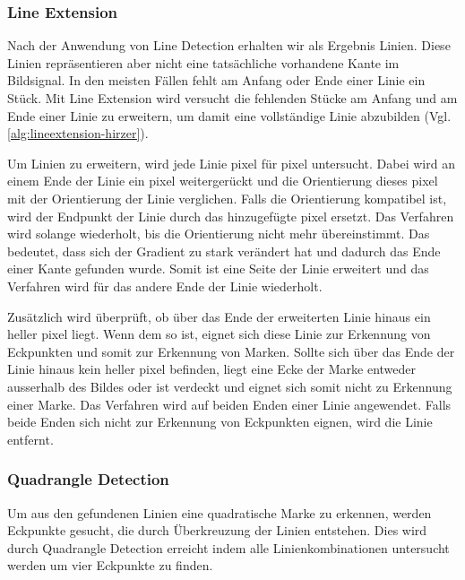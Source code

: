 \subsubsection{Line Extension} %
\label{sub:line_extension}



Nach der Anwendung von Line Detection erhalten wir als Ergebnis Linien. Diese Linien repräsentieren aber nicht eine
 tatsächliche vorhandene Kante im Bildsignal. In den meisten Fällen fehlt am Anfang oder Ende einer Linie ein Stück.
 Mit Line Extension wird versucht die fehlenden Stücke am Anfang und am Ende einer Linie zu erweitern, um damit eine
 vollständige Linie abzubilden (Vgl. \autoref{alg:lineextension-hirzer}).

Um Linien zu erweitern, wird jede Linie \gls{pixel} für \gls{pixel} untersucht. Dabei wird an einem Ende der Linie
 ein \gls{pixel} weitergerückt und die Orientierung dieses \gls{pixel} mit der Orientierung der Linie verglichen. Falls
 die Orientierung kompatibel ist, wird der Endpunkt der Linie durch das hinzugefügte \gls{pixel} ersetzt. Das Verfahren
 wird solange wiederholt, bis die Orientierung nicht mehr übereinstimmt. Das bedeutet, dass sich der Gradient zu stark
 verändert hat und dadurch das Ende einer Kante gefunden wurde. Somit ist eine Seite der Linie erweitert und das
 Verfahren wird für das andere Ende der Linie wiederholt.

Zusätzlich wird überprüft, ob über das Ende der erweiterten Linie hinaus ein heller \gls{pixel} liegt. Wenn dem so ist,
 eignet sich diese Linie zur Erkennung von Eckpunkten und somit zur Erkennung von Marken. Sollte sich über das Ende der
 Linie hinaus kein heller \gls{pixel} befinden, liegt eine Ecke der Marke entweder ausserhalb des Bildes oder ist
 verdeckt und eignet sich somit nicht zu Erkennung einer Marke. Das Verfahren wird auf beiden Enden einer Linie
 angewendet. Falls beide Enden sich nicht zur Erkennung von Eckpunkten eignen, wird die Linie entfernt.

\subsubsection{Quadrangle Detection} %
\label{sub:quadrangle_detection}

Um aus den gefundenen Linien eine quadratische Marke zu erkennen, werden Eckpunkte gesucht, die durch Überkreuzung der
 Linien entstehen. Dies wird durch Quadrangle Detection erreicht indem alle Linienkombinationen untersucht werden um
 vier Eckpunkte zu finden.

